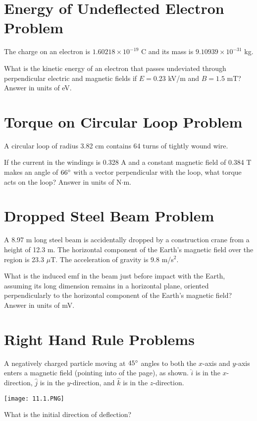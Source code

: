 \documentclass[../physics12.tex]{subfiles}
\begin{document}
\section{Energy of Undeflected Electron Problem}
The charge on an electron is $1.60218\times 10^{-19}$ C and its mass is $9.10939\times 10^{-31}$ kg. 

What is the kinetic energy of an electron that passes undeviated through perpendicular electric and magnetic fields if $E=0.23$ kV/m and $B=1.5$ mT? Answer in units of eV.

\section{Torque on Circular Loop Problem}
A circular loop of radius 3.82 cm contains 64 turns of tightly wound wire. 

If the current in the windings is 0.328 A and a constant magnetic field of 0.384 T makes an angle of $66\degree$ with a vector perpendicular with the loop, what torque acts on the loop? Answer in units of N$\cdot$m.

\section{Dropped Steel Beam Problem}
A 8.97 m long steel beam is accidentally dropped by a construction crane from a height of 12.3 m. The horizontal component of the Earth's magnetic field over the region is 23.3 $\mu$T. The acceleration of gravity is 9.8 m/s$^2$.

What is the induced emf in the beam just before impact with the Earth, assuming its long dimension remains in a horizontal plane, oriented perpendicularly to the horizontal 
component of the Earth's magnetic field? Answer in units of mV.

\section{Right Hand Rule Problems}
A negatively charged particle moving at $45\degree$ angles to both the $x$-axis and $y$-axis enters a magnetic field (pointing into of the page), as shown. 
$\hat{i}$ is in the $x$-direction, $\hat{j}$ is in the $y$-direction, and $\hat{k}$ is in the $z$-direction. 
\begin{center}
    \texttt{[image: 11.1.PNG]}
\end{center}
What is the initial direction of deflection?
\end{document}
